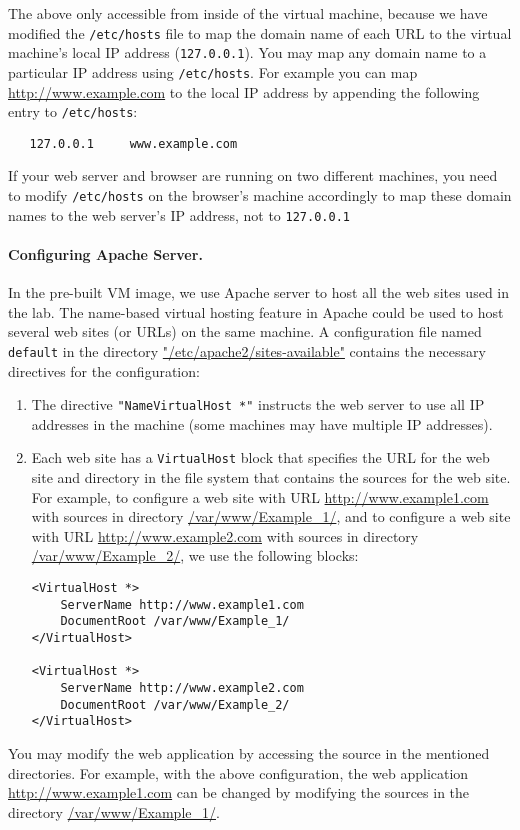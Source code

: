 

The above \urlisorurlsare only accessible from inside of the virtual machine, because we
have modified the \texttt{/etc/hosts} file to map the domain
name of each URL to the virtual machine's local IP
address ({\tt 127.0.0.1}).
You may map any domain name to a particular IP address using 
\texttt{/etc/hosts}. For example you can map
\url{http://www.example.com} to the local IP address by appending the
following entry to \texttt{/etc/hosts}:
\begin{verbatim}
   127.0.0.1     www.example.com 
\end{verbatim}
If your web server and browser are running on two different machines, you
need to modify \texttt{/etc/hosts} on the browser's machine accordingly
to map these domain names to the web server's IP address, not
to {\tt 127.0.0.1}


\paragraph{Configuring Apache Server.}
In the pre-built VM image, we use Apache server to host all the web
sites used in the lab. The name-based virtual hosting feature in
Apache could be used to host several web sites (or URLs) on the same
machine. A configuration file named {\tt default} in the directory
\url{"/etc/apache2/sites-available"} contains the necessary directives for the
configuration:

\begin{enumerate}
\item The directive {\tt "NameVirtualHost *"} instructs the web
  server to use all IP addresses in the machine (some machines
  may have multiple IP addresses).

\item Each web site has a {\tt VirtualHost} block that specifies the
  URL for the web site and directory in the file system that contains
  the sources for the web site. For example, to configure a web site
  with URL \url{http://www.example1.com} with sources in directory
  \url{/var/www/Example_1/}, and to configure a web site
  with URL \url{http://www.example2.com} with sources in directory
  \url{/var/www/Example_2/},
  we use the following blocks:

\begin{Verbatim}[frame=single]
<VirtualHost *>
    ServerName http://www.example1.com
    DocumentRoot /var/www/Example_1/
</VirtualHost>

<VirtualHost *>
    ServerName http://www.example2.com
    DocumentRoot /var/www/Example_2/
</VirtualHost>
\end{Verbatim}

\end{enumerate}

You may modify the web application by accessing the source in the
mentioned directories. For example, with the above configuration,
the web application \url{http://www.example1.com} can be changed by modifying
the sources in the directory \url{/var/www/Example_1/}.


